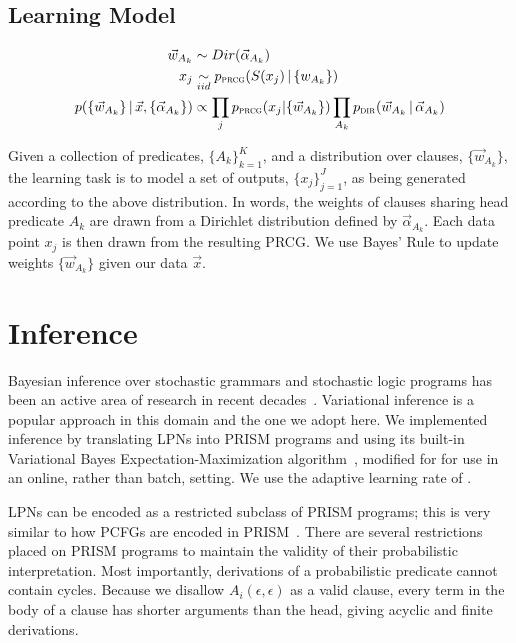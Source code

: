 \documentclass{article} %
\begin{document}
\subsection{Learning Model}


\begin{align*}
  \vec{w}_{A_k} &\sim Dir(\vec{\alpha}_{A_k})\\
  x_j &\underset{iid}{\sim} p_{\text{\textsc{prcg}}}(S(x_j)\,|\,\{w_{A_k}\})\\
  p(\{\vec{w}_{A_k}\}\,|\, \vec{x}, \{\vec{\alpha}_{A_k}\}) &\propto
  \prod_j p_{\text{\textsc{prcg}}}(x_j|\{\vec{w}_{A_k}\}) \prod_{A_k}
  p_{\text{\textsc{dir}}}(\vec{w}_{A_k}\,|\,\vec{\alpha}_{A_k})
\end{align*}

Given a collection of predicates, $\{A_k\}_{k=1}^{K}$, and a
distribution over clauses, $\{\vec{w}_{A_k}\}$, the learning task is
to model a set of outputs, $\{x_j\}_{j=1}^{J}$, as being generated
according to the above distribution. In words, the weights of clauses
sharing head predicate $A_k$ are drawn from a Dirichlet distribution
defined by $\vec{\alpha}_{A_k}$. Each data point $x_j$ is then drawn
from the resulting PRCG. We use Bayes' Rule to update  weights $\{\vec{w}_{A_k}\}$ given our data $\vec{x}$.

\section{Inference \label{sec:implementation}}

Bayesian inference over stochastic grammars and stochastic logic
programs has been an active area of research in recent
decades~\cite{DBLP:journals/etai/Muggleton00, cussens2001parameter,
  DBLP:conf/emnlp/LiangPJK07, goldwater2006contextual,
  johnson2006adaptor}.  Variational inference is a popular approach in
this domain and the one we adopt here. We implemented inference by
translating LPNs into PRISM programs and using its built-in
Variational Bayes Expectation-Maximization
algorithm~\cite{sato2008variational}, modified for for use in an
online, rather than batch, setting. We use the adaptive learning rate
of \cite{ranganath2013adaptive}.

LPNs can be encoded as a restricted subclass of PRISM programs; this
is very similar to how PCFGs are encoded in
PRISM~\cite{DBLP:conf/cl/2000}.  There are several restrictions placed
on PRISM programs to maintain the validity of their probabilistic
interpretation. Most importantly, derivations of a probabilistic
predicate cannot contain cycles. Because we disallow
$A_i(\epsilon,\epsilon)$ as a valid clause, every term in the body of
a clause has shorter arguments than the head, giving acyclic and
finite derivations.
\end{document}
